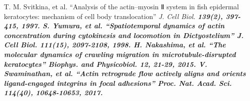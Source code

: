 \documentclass[10pt,twocolumn,a4j]{jarticle}
\begin{document}

\begin{thebibliography}{9}
      T. M. Svitkina, et al.
    ``Analysis of the actin--myosin Ⅱ system in fish epidermal keratocytes: mechanism of cell body translocation''  \sl{J. Cell Biol.} \bf{139}\rm{(2)}, 397-415, 1997.
      S. Yumura, et al.
    ``Spatiotemporal dynamics of actin concentration during cytokinesis and locomotion in Dictyostelium''  \sl{J. Cell Biol.} \bf{111}\rm{(15)}, 2097-2108, 1998.
   H. Nakashima, et al.
    ``The molecular dynamics of crawling migration in microtubule-disrupted keratocytes''  \sl{Biophys. and Physicobiol.} \bf{12}\rm{}, 21-29, 2015.
        V. Swaminathan, et al.
    ``Actin retrograde flow actively aligns and orients ligand-engaged integrins in focal adhesions''  \sl{Proc. Nat. Acad. Sci.} \bf{114}\rm{(40)}, 10648-10653, 2017.
\end{thebibliography}
\end{document}
